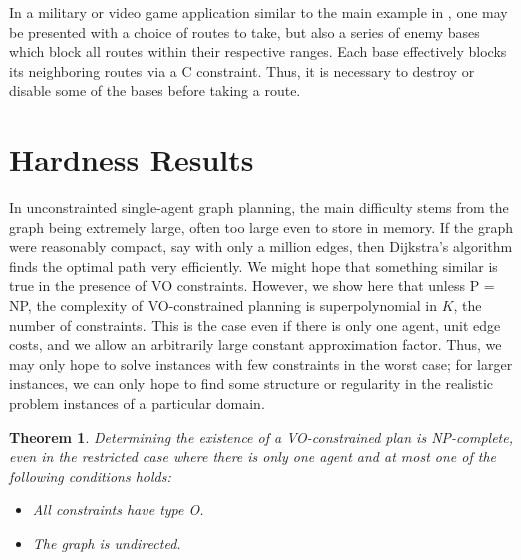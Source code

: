 \documentclass[letterpaper]{article}
\newtheorem{thm}{Theorem}
\begin{document}
In a military or video game application similar to the main example in \cite{karaman2011linear}, one may be presented with a choice of routes to take, but also a series of enemy bases which block all routes within their respective ranges. Each base effectively blocks its neighboring routes via a C constraint. Thus, it is necessary to destroy or disable some of the bases before taking a route.


\section{Hardness Results}

In unconstrainted single-agent graph planning, the main difficulty stems from the graph being extremely large, often too large even to store in memory. If the graph were reasonably compact, say with only a million edges, then Dijkstra's algorithm finds the optimal path very efficiently. We might hope that something similar is true in the presence of VO constraints. However, we show here that unless P = NP, the complexity of VO-constrained planning is superpolynomial in $K$, the number of constraints. This is the case even if there is only one agent, unit edge costs, and we allow an arbitrarily large constant approximation factor. Thus, we may only hope to solve instances with few constraints in the worst case; for larger instances, we can only hope to find some structure or regularity in the realistic problem instances of a particular domain.

\begin{thm}
\label{NP1}
Determining the existence of a VO-constrained plan is NP-complete, even in the restricted case where there is only one agent and at most one of the following conditions holds:
\begin{itemize}
\item All constraints have type O.
\item The graph is undirected.
\end{itemize}
\end{thm}
\end{document}
